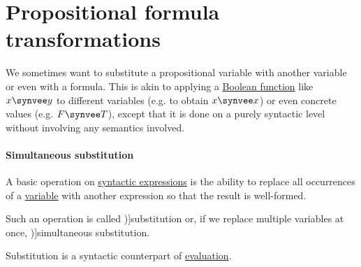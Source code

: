 \section{Propositional formula transformations}\label{sec:propositional_formula_transformations}

We sometimes want to substitute a propositional variable with another variable or even with a formula. This is akin to applying a \hyperref[def:boolean_function]{Boolean function} like \( x \synvee y \) to different variables (e.g. to obtain \( x \synvee x \)) or even concrete values (e.g. \( F \synvee T \)), except that it is done on a purely syntactic level without involving any semantics involved.

\paragraph{Simultaneous substitution}

\begin{concept}\label{con:syntactic_substitution}
  A basic operation on \hyperref[con:expression]{syntactic expressions} is the ability to replace all occurrences of a \hyperref[con:variable]{variable} with another expression so that the result is well-formed.

  Such an operation is called \term[en=substitution (\cite[78]{Kleene1971Metamathematics})]{substitution} or, if we replace multiple variables at once, \term[en=simultaneous substitution (\cite[def. 3.1.3]{CitkinMuravitsky2022ConsequenceRelations})]{simultaneous substitution}.

  Substitution is a syntactic counterpart of \hyperref[con:evaluation]{evaluation}.
\end{concept}

